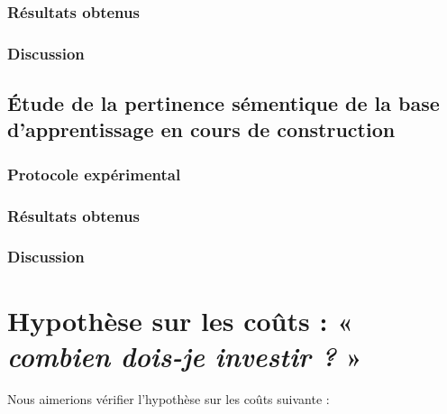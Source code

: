 			\subsubsection{Résultats obtenus}

			\subsubsection{Discussion}
		
		\subsection{Étude de la pertinence sémentique de la base d'apprentissage en cours de construction}
		
			\subsubsection{Protocole expérimental}

			\subsubsection{Résultats obtenus}

			\subsubsection{Discussion}
	

    \section{Hypothèse sur les coûts : « \textit{combien dois-je investir ?} »}
	\label{section:4.4-HYPOTHESE-COUTS}
	
		Nous aimerions vérifier l'hypothèse sur les coûts suivante :

